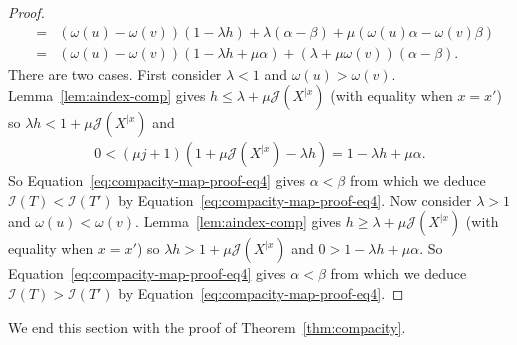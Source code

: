 \documentclass[11 pt]{modarticle}
\newcommand{\wmap}{\omega}
\newcommand{\rtree}[2]{{#1}^{\lvert #2}}
\newcommand{\indexsymbol}{\mathcal{I}}
\newcommand{\tindex}[1]{\indexsymbol(#1)}
\newcommand{\rindexsymbol}{\mathcal{J}}
\newcommand{\rindex}[2]{\rindexsymbol(\rtree{#2}{#1})}
\begin{document}
\begin{proof}
\begin{eqnarray}
	& = & (\wmap(u) - \wmap(v))(1 - \lambda h) + \lambda(\alpha - \beta) + \mu (\wmap(u)\alpha - \wmap(v) \beta) \nonumber \\
	& = & (\wmap(u) - \wmap(v))(1 - \lambda h + \mu \alpha)  + (\lambda + \mu \wmap(v))(\alpha - \beta). \label{eq:compacity-map-proof-eq4}
\end{eqnarray}
There are two cases. First consider $\lambda < 1$ and $\wmap(u) > \wmap(v)$. Lemma~\ref{lem:aindex-comp} gives $h \leq \lambda + \mu \rindex{x}{X}$ (with equality when $x = x'$) so $\lambda h < 1 + \mu \rindex{x}{X}$ and
\begin{eqnarray*}
	0 < (\mu j + 1)(1 + \mu \rindex{x}{X} - \lambda h) =  1 - \lambda h + \mu \alpha.
\end{eqnarray*}
So Equation~\eqref{eq:compacity-map-proof-eq4} gives $\alpha < \beta$ from which we deduce $\tindex{T} < \tindex{T'}$ by Equation~\eqref{eq:compacity-map-proof-eq4}. Now consider $\lambda > 1$ and $\wmap(u) < \wmap(v)$. Lemma~\ref{lem:aindex-comp} gives $h \geq \lambda + \mu \rindex{x}{X}$  (with equality when $x = x'$) so $\lambda h > 1 + \mu \rindex{x}{X}$ and $0 > 1 - \lambda h + \mu \alpha$. So Equation~\eqref{eq:compacity-map-proof-eq4} gives $\alpha < \beta$ from which we deduce $\tindex{T} > \tindex{T'}$ by Equation~\eqref{eq:compacity-map-proof-eq4}.
\end{proof}

We end this section with the proof of Theorem~\ref{thm:compacity}.
\end{document}
